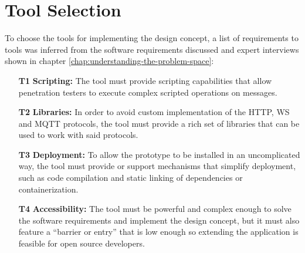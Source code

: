 \section{Tool Selection}
\label{sec:tool-selection}
To choose the tools for implementing the design concept, a list of requirements to tools was inferred from the software requirements discussed and expert interviews shown in chapter \ref{chap:understanding-the-problem-space}:
\begin{itemize}
    \item [\textbf{T1}] \textbf{Scripting:} The tool must provide scripting capabilities that allow penetration testers to execute complex scripted operations on messages.
    \item [\textbf{T2}] \textbf{Libraries:} In order to avoid custom implementation of the \ac{HTTP}, \ac{WS} and \ac{MQTT} protocols, the tool must provide a rich set of libraries that can be used to work with said protocols.
    \item [\textbf{T3}] \textbf{Deployment:} To allow the prototype to be installed in an uncomplicated way, the tool must provide or support mechanisms that simplify deployment, such as code compilation and static linking of dependencies or containerization.
    \item [\textbf{T4}] \textbf{Accessibility:} The tool must be powerful and complex enough to solve the software requirements and implement the design concept, but it must also feature a \enquote{barrier or entry} that is low enough so extending the application is feasible for open source developers.
\end{itemize}


